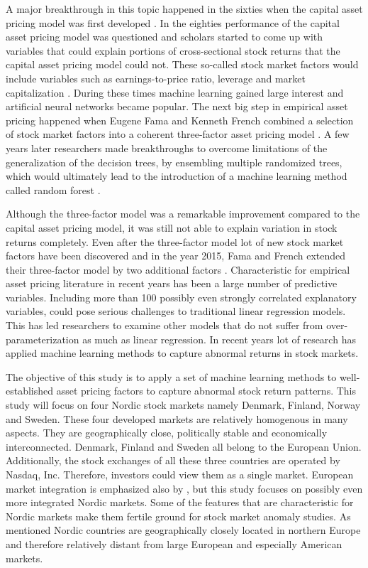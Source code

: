 \documentclass[12pt]{article}
\begin{document}
A major breakthrough in this topic happened in the sixties when the capital asset pricing model was first developed \citep{Sharpe1964, Lintner1965}. In the eighties performance of the capital asset pricing model was questioned and scholars started to come up with variables that could explain portions of cross-sectional stock returns that the capital asset pricing model could not. These so-called stock market factors would include variables such as earnings-to-price ratio, leverage and market capitalization \citep{Basu1977, Bhandari1988, BANZ1981}. During these times machine learning gained large interest and artificial neural networks became popular. The next big step in empirical asset pricing happened when Eugene Fama and Kenneth French combined a selection of stock market factors into a coherent three-factor asset pricing model \citep{FAMA19933}. A few years later researchers made breakthroughs to overcome limitations of the generalization of the decision trees, by ensembling multiple randomized trees, which would ultimately lead to the introduction of a machine learning method called random forest \citep{Ho1995, Breiman20015}. \par

Although the three-factor model was a remarkable improvement compared to the capital asset pricing model, it was still not able to explain variation in stock returns completely. Even after the three-factor model lot of new stock market factors have been discovered and in the year 2015, Fama and French extended their three-factor model by two additional factors \citep{FAMA20151}. Characteristic for empirical asset pricing literature in recent years has been a large number of predictive variables. Including more than 100 possibly even strongly correlated explanatory variables, could pose serious challenges to traditional linear regression models. This has led researchers to examine other models that do not suffer from over-parameterization as much as linear regression. In recent years lot of research has applied machine learning methods to capture abnormal returns in stock markets.  \par

The objective of this study is to apply a set of machine learning methods to well-established asset pricing factors to capture abnormal stock return patterns. This study will focus on four Nordic stock markets namely Denmark, Finland, Norway and Sweden. These four developed markets are relatively homogenous in many aspects. They are geographically close, politically stable and economically interconnected. Denmark, Finland and Sweden all belong to the European Union. Additionally, the stock exchanges of all these three countries are operated by Nasdaq, Inc. Therefore, investors could view them as a single market. European market integration is emphasized also by \citet{FAMA2012457}, but this study focuses on possibly even more integrated Nordic markets. Some of the features that are characteristic for Nordic markets make them fertile ground for stock market anomaly studies. As mentioned Nordic countries are geographically closely located in northern Europe and therefore relatively distant from large European and especially American markets.  \par
\end{document}
